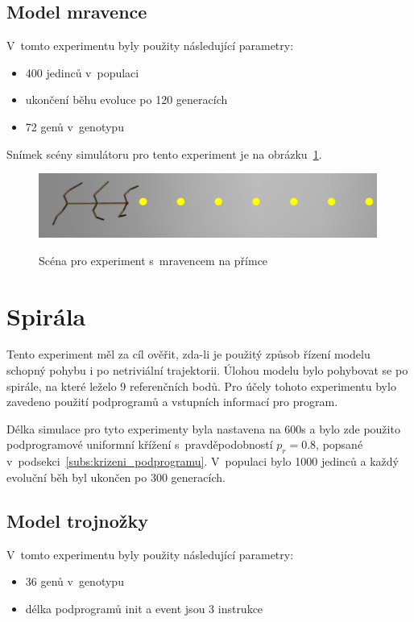 \subsection{Model mravence}
V~tomto experimentu byly použity následující parametry:
\begin{itemize}
    \item 400 jedinců v~populaci
    \item ukončení běhu evoluce po 120 generacích
    \item 72 genů v~genotypu
\end{itemize}

Snímek scény simulátoru pro tento experiment je na obrázku~\ref{fig:mravenec_primka_zhora}.
\begin{figure}[h]
    \centering
    {\includegraphics[width=30em]{obrazky/mravenec_primka_zhora.png}}
    \caption{
    Scéna pro experiment s~mravencem na přímce
    }
    \label{fig:mravenec_primka_zhora}
\end{figure}





\section{Spirála}
\label{sec:experiment_spirala}
Tento experiment měl za cíl ověřit, zda-li je použitý způsob řízení modelu schopný pohybu i po netriviální trajektorii.
Úlohou modelu bylo pohybovat se po spirále, na které leželo 9 referenčních bodů.
Pro účely tohoto experimentu bylo zavedeno použití podprogramů a vstupních informací pro program.

Délka simulace pro tyto experimenty byla nastavena na 600s a bylo zde použito podprogramové uniformní křížení s~pravděpodobností $p_r = 0.8$, popsané v~podsekci~\ref{subs:krizeni_podprogramu}.
V~populaci bylo 1000 jedinců a každý evoluční běh byl ukončen po 300 generacích.

\subsection{Model trojnožky}
V~tomto experimentu byly použity následující parametry:
\begin{itemize}
    \item 36 genů v~genotypu
    \item délka podprogramů init a event jsou 3 instrukce
\end{itemize}

